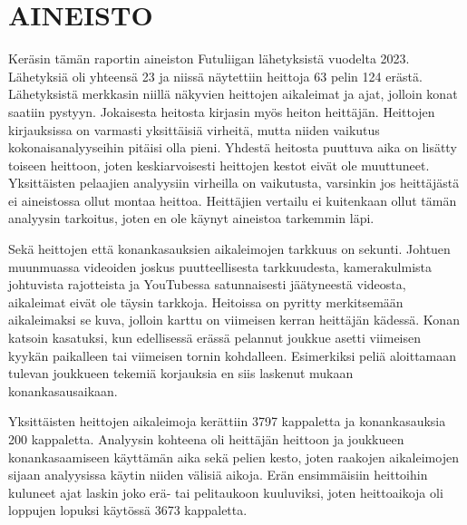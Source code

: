 \section{AINEISTO}
    Keräsin tämän raportin aineiston Futuliigan lähetyksistä vuodelta 2023.
    Lähetyksiä oli yhteensä 23 ja niissä näytettiin heittoja 63 pelin 124 erästä.
    Lähetyksistä merkkasin niillä näkyvien heittojen aikaleimat ja ajat, jolloin konat saatiin pystyyn.
    Jokaisesta heitosta kirjasin myös heiton heittäjän.
    Heittojen kirjauksissa on varmasti yksittäisiä virheitä,
    mutta niiden vaikutus kokonaisanalyyseihin pitäisi olla pieni.
    Yhdestä heitosta puuttuva aika on lisätty toiseen heittoon,
    joten keskiarvoisesti heittojen kestot eivät ole muuttuneet.
    Yksittäisten pelaajien analyysiin virheilla on vaikutusta,
    varsinkin jos heittäjästä ei aineistossa ollut montaa heittoa.
    Heittäjien vertailu ei kuitenkaan ollut tämän analyysin tarkoitus,
    joten en ole käynyt aineistoa tarkemmin läpi.

    Sekä heittojen että konankasauksien aikaleimojen tarkkuus on sekunti.
    Johtuen muunmuassa videoiden joskus puutteellisesta tarkkuudesta,
    kamerakulmista johtuvista rajotteista
    ja YouTubessa satunnaisesti jäätyneestä videosta,
    aikaleimat eivät ole täysin tarkkoja.
    Heitoissa on pyritty merkitsemään aikaleimaksi se kuva, jolloin karttu on viimeisen kerran heittäjän kädessä.
    Konan katsoin kasatuksi, kun edellisessä erässä pelannut joukkue asetti viimeisen kyykän paikalleen tai viimeisen tornin kohdalleen.
    E\-si\-mer\-kik\-si peliä aloittamaan tulevan joukkueen tekemiä korjauksia en siis laskenut mukaan konankasausaikaan.

    Yksittäisten heittojen aikaleimoja kerättiin 3797 kappaletta ja konankasauksia 200 kappaletta.
    Analyysin kohteena oli heittäjän heittoon ja joukkueen konankasaamiseen käyttämän aika sekä pelien kesto,
    joten raakojen aikaleimojen sijaan analyysissa käytin niiden välisiä aikoja.
    Erän ensimmäisiin heittoihin kuluneet ajat laskin joko erä- tai pelitaukoon kuuluviksi,
    joten heittoaikoja oli loppujen lopuksi käytössä 3673 kappaletta.

